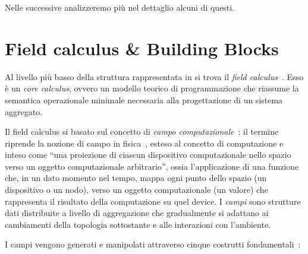 Nelle  successive analizzeremo più nel dettaglio alcuni di questi.

\section[Field calculus]{Field calculus \& Building Blocks}\label{sec:field-calculus}

Al livello più basso della struttura rappresentata in  si trova il \emph{field calculus}~\cite{FieldCalculusFOCLASA2013}.
Esso è un \emph{core calculus}, ovvero un modello teorico di programmazione che riassume la semantica operazionale minimale necessaria alla progettazione di un sistema aggregato.

Il field calculus si basato sul concetto di \emph{campo computazionale}~\cite{FieldCalculusFOCLASA2013}:
il termine riprende la nozione di campo in fisica~\cite{mcmullin2002origins}, esteso al concetto di computazione
e inteso come ``una proiezione di ciascun dispositivo computazionale nello spazio verso un oggetto computazionale arbitrario'',
ossia l'applicazione di una funzione che, in un dato momento nel tempo, mappa ogni punto dello spazio (un dispositivo o un nodo),
verso un oggetto computazionale (un valore) che rappresenta il risultato della computazione su quel device.
I \emph{campi} sono strutture dati distribuite a livello di aggregazione che gradualmente si adattano ai cambiamenti della topologia sottostante e alle interazioni con l'ambiente.

I campi vengono generati e manipolati attraverso cinque costrutti fondamentali~\cite{BV-FOCAS2014,computationalfields-forte2015}:



